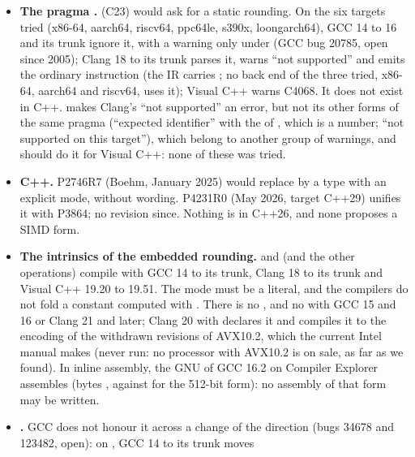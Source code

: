 \documentclass[12pt,a4paper,twoside,openright]{book}
\begin{document}
\begin{itemize}
\item[$\bullet$] \textbf{The pragma .}
 (C23) would ask for a static rounding. On
the six targets tried (x86-64, aarch64, riscv64, ppc64le, s390x,
loongarch64), GCC 14 to 16 and its trunk ignore it, with a warning only
under  (GCC bug 20785, open since 2005); Clang 18 to its trunk
parses it, warns ``not supported'' and emits the ordinary instruction (the
IR carries ; no back end of the three tried, x86-64,
aarch64 and riscv64, uses it); Visual C++ warns C4068. It does not exist in
C++.  makes Clang's ``not supported'' an
error, but not its other forms of the same pragma (``expected identifier''
with the  of , which is a number; ``not
supported on this target''), which belong to another group of warnings, and
 should do it for Visual C++: none of these was tried.
\item[$\bullet$] \textbf{C++.} P2746R7 (Boehm, January 2025) would replace
 by a type with an explicit mode, without wording. P4231R0
(May 2026, target C++29) unifies it with P3864; no revision since. Nothing
is in C++26, and none proposes a SIMD form.
\item[$\bullet$] \textbf{The intrinsics of the embedded rounding.}
 and  (and the
other operations) compile with GCC 14 to its trunk, Clang 18 to its trunk
and Visual C++ 19.20 to 19.51. The mode must be a literal, and the compilers
do not fold a constant computed with . There is no
, and no  with GCC
15 and 16 or Clang 21 and later; Clang 20 with  declares
it and compiles it to the encoding of the withdrawn revisions of AVX10.2,
which the current Intel manual makes  (never run: no processor
with AVX10.2 is on sale, as far as we found). In inline assembly, the GNU
 of GCC 16.2 on Compiler Explorer assembles
 (bytes
, against  for the 512-bit
form): no assembly of that form may be written.
\item[$\bullet$] \textbf{.} GCC does not honour it
across a change of the direction (bugs 34678 and 123482, open): on
, GCC 14 to its trunk moves

\end{itemize}
\end{document}
